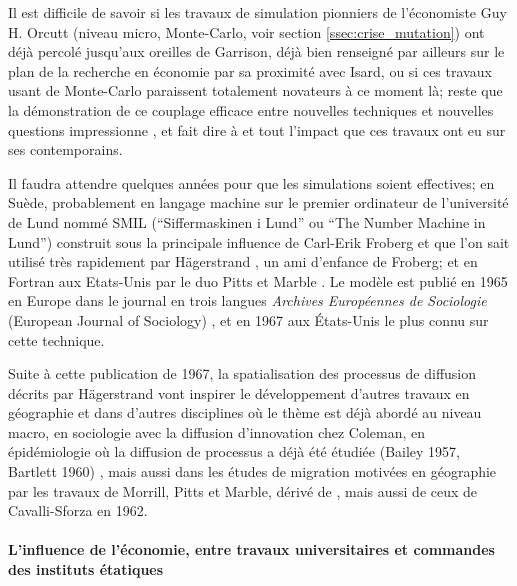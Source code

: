 Il est difficile de savoir si les travaux de simulation pionniers de l'économiste Guy H. Orcutt \autocites{Orcutt1957, Orcutt1960} (niveau micro, Monte-Carlo, voir section \ref{ssec:crise_mutation}) ont déjà percolé jusqu'aux oreilles de Garrison, déjà bien renseigné par ailleurs sur le plan de la recherche en économie par sa proximité avec Isard, ou si ces travaux usant de Monte-Carlo paraissent totalement novateurs à ce moment là; reste que la démonstration de ce couplage efficace entre nouvelles techniques et nouvelles questions impressionne \autocite[120]{Unwin1992}, et fait dire à \textcite{Morril2005} et \textcite{Gould1970} tout l'impact que ces travaux ont eu sur ses contemporains.

Il faudra attendre quelques années pour que les simulations soient effectives; en Suède, probablement en langage machine sur le premier ordinateur de l'université de Lund nommé SMIL (\foreignquote{sweden}{Siffermaskinen i Lund} ou \foreignquote{english}{The Number Machine in Lund}) construit sous la principale influence de Carl-Erik Froberg et que l'on sait utilisé très rapidement par Hägerstrand , un ami d'enfance de Froberg; et en Fortran  aux Etats-Unis par le duo Pitts et Marble \autocites{Morril2005, Marble1972, Pitts1963}. Le modèle est publié en 1965 en Europe dans le journal en trois langues \textit{Archives Européennes de Sociologie} (European Journal of Sociology) \autocite{Hagerstrand1965}, et en 1967 \autocite{Hagerstrand1967a} aux États-Unis le plus connu sur cette technique. 


Suite à cette publication de 1967, la spatialisation des processus de diffusion décrits par Hägerstrand vont inspirer le développement d'autres travaux en géographie et dans d'autres disciplines où le thème est déjà abordé au niveau macro, en sociologie avec la diffusion d'innovation chez Coleman, en épidémiologie \autocite{Cliff1981, Cliff2000} où la diffusion de processus a déjà été étudiée (Bailey 1957, Bartlett 1960) \autocite{Pitts1963, Morrill1968}, mais aussi dans les études de migration motivées en géographie par les travaux de Morrill, Pitts et Marble, dérivé de \autocite{Wolpert1965}, mais aussi de ceux de Cavalli-Sforza en 1962. 

\paragraph{L'influence de l'économie, entre travaux universitaires et commandes des instituts étatiques}

